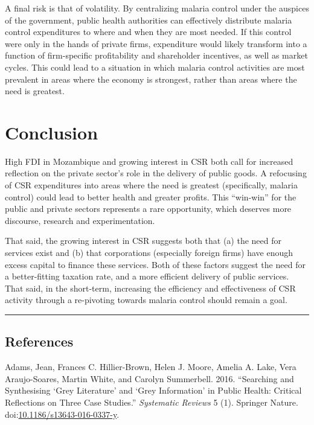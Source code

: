 \documentclass[]{elsarticle} %
\begin{document}
A final risk is that of volatility. By centralizing malaria control
under the auspices of the government, public health authorities can
effectively distribute malaria control expenditures to where and when
they are most needed. If this control were only in the hands of private
firms, expenditure would likely transform into a function of
firm-specific profitability and shareholder incentives, as well as
market cycles. This could lead to a situation in which malaria control
activities are most prevalent in areas where the economy is strongest,
rather than areas where the need is greatest.

\section{Conclusion}\label{conclusion}

High FDI in Mozambique and growing interest in CSR both call for
increased reflection on the private sector's role in the delivery of
public goods. A refocusing of CSR expenditures into areas where the need
is greatest (specifically, malaria control) could lead to better health
and greater profits. This ``win-win'' for the public and private sectors
represents a rare opportunity, which deserves more discourse, research
and experimentation.

That said, the growing interest in CSR suggests both that (a) the need
for services exist and (b) that corporations (especially foreign firms)
have enough excess capital to finance these services. Both of these
factors suggest the need for a better-fitting taxation rate, and a more
efficient delivery of public services. That said, in the short-term,
increasing the efficiency and effectiveness of CSR activity through a
re-pivoting towards malaria control should remain a goal.

\begin{center}\rule{0.5\linewidth}{\linethickness}\end{center}

\subsection*{References}\label{references}

\hypertarget{refs}{}
\hypertarget{ref-Adams2016}{}
Adams, Jean, Frances C. Hillier-Brown, Helen J. Moore, Amelia A. Lake,
Vera Araujo-Soares, Martin White, and Carolyn Summerbell. 2016.
``Searching and Synthesising `Grey Literature' and `Grey Information' in
Public Health: Critical Reflections on Three Case Studies.''
\emph{Systematic Reviews} 5 (1). Springer Nature.
doi:\href{https://doi.org/10.1186/s13643-016-0337-y}{10.1186/s13643-016-0337-y}.
\end{document}
